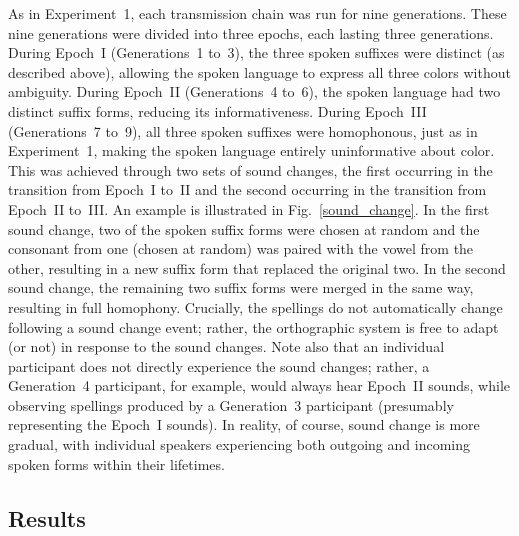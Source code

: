 \documentclass[doc,biblatex]{apa7}
\begin{document}
As in Experiment~1, each transmission chain was run for nine generations. These nine generations were divided into three epochs, each lasting three generations. During Epoch~I (Generations~1 to~3), the three spoken suffixes were distinct (as described above), allowing the spoken language to express all three colors without ambiguity. During Epoch~II (Generations~4 to~6), the spoken language had two distinct suffix forms, reducing its informativeness. During Epoch~III (Generations~7 to~9), all three spoken suffixes were homophonous, just as in Experiment~1, making the spoken language entirely uninformative about color. This was achieved through two sets of sound changes, the first occurring in the transition from Epoch~I to~II and the second occurring in the transition from Epoch~II to~III. An example is illustrated in Fig.~\ref{sound_change}. In the first sound change, two of the spoken suffix forms were chosen at random and the consonant from one (chosen at random) was paired with the vowel from the other, resulting in a new suffix form that replaced the original two. In the second sound change, the remaining two suffix forms were merged in the same way, resulting in full homophony. Crucially, the spellings do not automatically change following a sound change event; rather, the orthographic system is free to adapt (or not) in response to the sound changes. Note also that an individual participant does not directly experience the sound changes; rather, a Generation~4 participant, for example, would always hear Epoch~II sounds, while observing spellings produced by a Generation~3 participant (presumably representing the Epoch~I sounds). In reality, of course, sound change is more gradual, with individual speakers experiencing both outgoing and incoming spoken forms within their lifetimes.

\subsection{Results}
\end{document}
